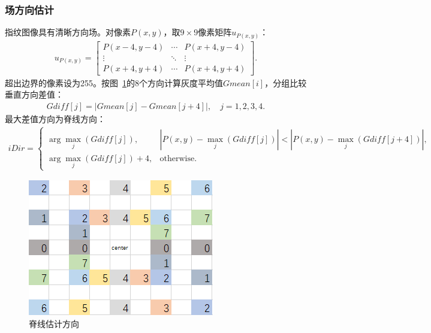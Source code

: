\documentclass{whutmod}
\begin{document}
            \subsubsection{场方向估计}
                指纹图像具有清晰方向场。对像素$P(x,y)$，取$9 \times 9$像素矩阵$u_{P(x,y)}$：
                \begin{gather*}
                    u_{P(x,y)} = \begin{bmatrix}
                        P(x-4,y-4) & \cdots & P(x+4,y-4) \\
                        \vdots & \ddots & \vdots \\
                        P(x+4,y+4) & \cdots & P(x+4,y+4)
                    \end{bmatrix}.
                \end{gather*}
                超出边界的像素设为255。按图~\ref{adf}的8个方向计算灰度平均值$Gmean[i]$，分组比较垂直方向差值：
                \begin{gather*}
                    Gdiff[j] = |Gmean[j] - Gmean[j+4]|, \quad j=1,2,3,4.
                \end{gather*}
                最大差值方向为脊线方向：
                \begin{gather*}
                    iDir = \begin{cases}
                        \arg \max_j (Gdiff[j]), & |P(x,y) - \max_j (Gdiff[j])| < |P(x,y) - \max_j (Gdiff[j+4])|, \\
                        \arg \max_j (Gdiff[j]) + 4, & \text{otherwise}.
                    \end{cases}
                \end{gather*}
                \begin{figure}[H]
                    \centering
                    \includegraphics[width=.5\textwidth]{figures/chou.png}
                    \caption{脊线估计方向}\label{adf}
                \end{figure}
\end{document}
